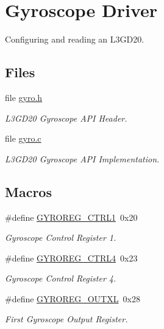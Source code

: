 \hypertarget{group__gyro}{\section{Gyroscope Driver}
\label{group__gyro}
}


Configuring and reading an L3\-G\-D20.  


\subsection*{Files}
\begin{DoxyCompactItemize}
\item 
file \hyperlink{gyro_8h}{gyro.\-h}
\begin{DoxyCompactList}\small\item\em L3\-G\-D20 Gyroscope A\-P\-I Header. \end{DoxyCompactList}\item 
file \hyperlink{gyro_8c}{gyro.\-c}
\begin{DoxyCompactList}\small\item\em L3\-G\-D20 Gyroscope A\-P\-I Implementation. \end{DoxyCompactList}\end{DoxyCompactItemize}
\subsection*{Macros}
\begin{DoxyCompactItemize}
\item 
\#define \hyperlink{group__gyro_ga59d5eec860eab49733b4a814731e356c}{G\-Y\-R\-O\-R\-E\-G\-\_\-\-C\-T\-R\-L1}~0x20
\begin{DoxyCompactList}\small\item\em Gyroscope Control Register 1. \end{DoxyCompactList}\item 
\#define \hyperlink{group__gyro_gae9b6f4aab3818fdb4c99970918e0a705}{G\-Y\-R\-O\-R\-E\-G\-\_\-\-C\-T\-R\-L4}~0x23
\begin{DoxyCompactList}\small\item\em Gyroscope Control Register 4. \end{DoxyCompactList}\item 
\#define \hyperlink{group__gyro_ga8840a0f1e53e6999ddf435a61c0dc279}{G\-Y\-R\-O\-R\-E\-G\-\_\-\-O\-U\-T\-X\-L}~0x28
\begin{DoxyCompactList}\small\item\em First Gyroscope Output Register. \end{DoxyCompactList}\end{DoxyCompactItemize}
